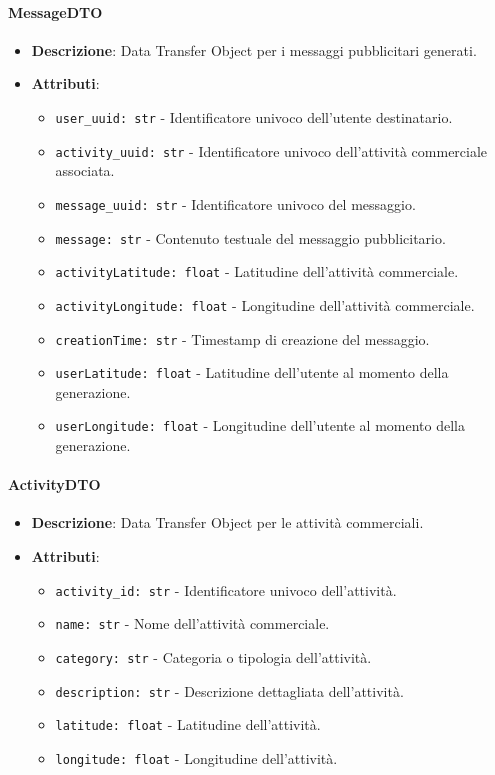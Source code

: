 \documentclass[10pt]{article}
\begin{document}
    \paragraph{MessageDTO}
    \begin{itemize}
        \item \textbf{Descrizione}: Data Transfer Object per i messaggi pubblicitari generati.
        \item \textbf{Attributi}:
        \begin{itemize}
            \item \texttt{user\_uuid: str} - Identificatore univoco dell'utente destinatario.
            \item \texttt{activity\_uuid: str} - Identificatore univoco dell'attività commerciale associata.
            \item \texttt{message\_uuid: str} - Identificatore univoco del messaggio.
            \item \texttt{message: str} - Contenuto testuale del messaggio pubblicitario.
            \item \texttt{activityLatitude: float} - Latitudine dell'attività commerciale.
            \item \texttt{activityLongitude: float} - Longitudine dell'attività commerciale.
            \item \texttt{creationTime: str} - Timestamp di creazione del messaggio.
            \item \texttt{userLatitude: float} - Latitudine dell'utente al momento della generazione.
            \item \texttt{userLongitude: float} - Longitudine dell'utente al momento della generazione.
        \end{itemize}
    \end{itemize}

    \paragraph{ActivityDTO}
    \begin{itemize}
        \item \textbf{Descrizione}: Data Transfer Object per le attività commerciali.
        \item \textbf{Attributi}:
        \begin{itemize}
            \item \texttt{activity\_id: str} - Identificatore univoco dell'attività.
            \item \texttt{name: str} - Nome dell'attività commerciale.
            \item \texttt{category: str} - Categoria o tipologia dell'attività.
            \item \texttt{description: str} - Descrizione dettagliata dell'attività.
            \item \texttt{latitude: float} - Latitudine dell'attività.
            \item \texttt{longitude: float} - Longitudine dell'attività.
        \end{itemize}
    \end{itemize}
\end{document}
